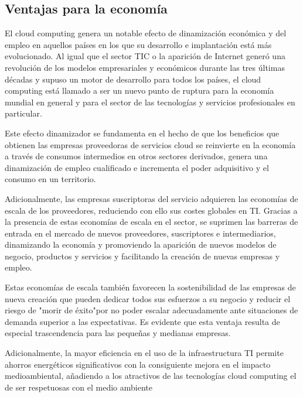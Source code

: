 \documentclass[a4paper, 12pt]{report}
\begin{document}
\subsection{Ventajas para la econom\'ia}
\begin{justify}
El cloud computing genera un notable efecto de dinamizaci\'on econ\'omica y del empleo en aquellos pa\'ises en los que su desarrollo e implantaci\'on est\'a m\'as evolucionado. Al igual que el sector TIC o la aparici\'on de Internet gener\'o una revoluci\'on de los modelos empresariales y econ\'omicos durante las tres \'ultimas d\'ecadas y supuso un motor de desarrollo para todos los pa\'ises, el cloud computing est\'a llamado a ser un nuevo punto de ruptura para la econom\'ia mundial en general y para el sector de las tecnolog\'ias y servicios profesionales en particular.

Este efecto dinamizador se fundamenta en el hecho de que los beneficios que obtienen las empresas proveedoras de servicios cloud se reinvierte en la econom\'ia a trav\'es de consumos intermedios en otros sectores derivados, genera una dinamizaci\'on de empleo cualificado e incrementa el poder adquisitivo y el consumo en un territorio. 

Adicionalmente, las empresas suscriptoras del servicio adquieren las econom\'ias de escala de los proveedores, reduciendo con ello sus costes globales en TI. Gracias a la presencia de estas econom\'ias de escala en el sector, se suprimen las barreras de entrada en el mercado de nuevos proveedores, suscriptores e intermediarios, dinamizando la econom\'ia y promoviendo la aparición de nuevos modelos de negocio, productos y servicios y facilitando la creación de nuevas empresas y empleo.

Estas econom\'ias de escala también favorecen la sostenibilidad de las empresas de nueva creación que pueden dedicar todos sus esfuerzos a su negocio y reducir el riesgo de "morir de \'exito"\hspace{0.1cm}por no poder escalar adecuadamente ante situaciones de demanda superior a las expectativas. Es evidente que esta ventaja resulta de especial trascendencia para las pequeñas y medianas empresas.

Adicionalmente, la mayor eficiencia en el uso de la infraestructura TI permite ahorros energ\'eticos significativos con la consiguiente mejora en el impacto medioambiental, añadiendo a los atractivos de las tecnolog\'ias cloud computing el de ser respetuosas con el medio ambiente

\end{justify}
\newpage
\end{document}
